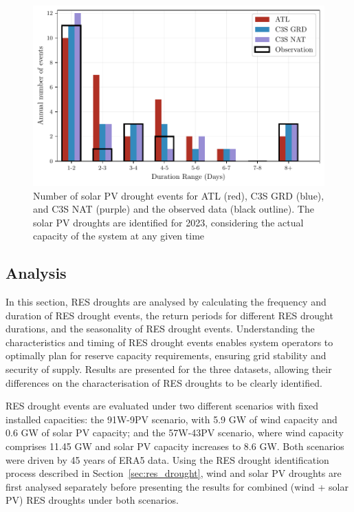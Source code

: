 \documentclass[preprint, 12pt]{elsarticle}
\begin{document}
\begin{figure}[!ht]
	\centering
	\includegraphics[width=\textwidth]{verification_pv_number_events.pdf}
	\caption{Number of solar PV drought events for ATL (red), C3S GRD (blue), and C3S NAT (purple) and the observed data (black outline). The solar PV droughts are identified for 2023, considering the actual capacity of the system at any given time}
	\label{fig:bar_number_events_verification_pv}
\end{figure}

\subsection{Analysis}
\label{sec:analysis}

In this section, RES droughts are analysed by calculating the frequency and duration of RES drought events, the return periods for different RES drought durations, and the seasonality of RES drought events. Understanding the characteristics and timing of RES drought events enables system operators to optimally plan for reserve capacity requirements, ensuring grid stability and security of supply. Results are presented for the three datasets, allowing their differences on the characterisation of RES droughts to be clearly identified.

RES drought events are evaluated under two different scenarios with fixed installed capacities: the 91W-9PV scenario, with 5.9 GW of wind capacity and 0.6 GW of solar PV capacity; and the 57W-43PV scenario, where wind capacity comprises 11.45 GW and solar PV capacity increases to 8.6 GW. Both scenarios were driven by 45 years of ERA5 data. Using the RES drought identification process described in Section~\ref{sec:res_drought}, wind and solar PV droughts are first analysed separately before presenting the results for combined (wind + solar PV) RES droughts under both scenarios.
\end{document}
